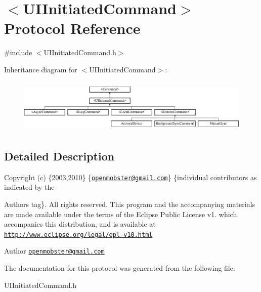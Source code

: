 \hypertarget{protocol_u_i_initiated_command-p}{
\section{$<$\-U\-I\-Initiated\-Command$>$ \-Protocol \-Reference}
\label{protocol_u_i_initiated_command-p}
}


{\ttfamily \#include $<$\-U\-I\-Initiated\-Command.\-h$>$}

\-Inheritance diagram for $<$\-U\-I\-Initiated\-Command$>$\-:\begin{figure}[H]
\begin{center}
\leavevmode
\includegraphics[height=2.604651cm]{protocol_u_i_initiated_command-p}
\end{center}
\end{figure}


\subsection{\-Detailed \-Description}
\-Copyright (c) \{2003,2010\} \{\href{mailto:openmobster@gmail.com}{\tt openmobster@gmail.\-com}\} \{individual contributors as indicated by the \begin{DoxyAuthor}{\-Authors}
tag\}. \-All rights reserved. \-This program and the accompanying materials are made available under the terms of the \-Eclipse \-Public \-License v1. which accompanies this distribution, and is available at \href{http://www.eclipse.org/legal/epl-v10.html}{\tt http\-://www.\-eclipse.\-org/legal/epl-\/v10.\-html}
\end{DoxyAuthor}
\begin{DoxyAuthor}{\-Author}
\href{mailto:openmobster@gmail.com}{\tt openmobster@gmail.\-com} 
\end{DoxyAuthor}


\-The documentation for this protocol was generated from the following file\-:\begin{DoxyCompactItemize}
\item 
\-U\-I\-Initiated\-Command.\-h\end{DoxyCompactItemize}
